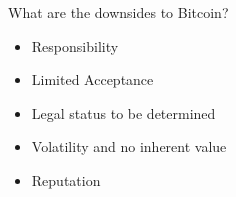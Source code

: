 \documentclass[12pt, usepdftitle=false]{beamer}
\begin{document}

\begin{frame}{What are the downsides to Bitcoin?}
	\begin{itemize}
		\pause\item Responsibility
		\pause\item Limited Acceptance
		\pause\item Legal status to be determined
		\pause\item Volatility and no inherent value
		\pause\item Reputation
	\end{itemize}
\end{frame}

\end{document}
